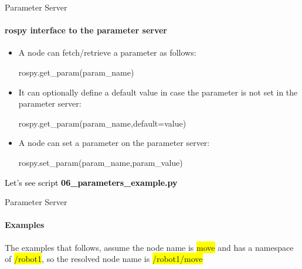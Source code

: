 \documentclass{beamer}
\begin{document}
\begin{frame}{Parameter Server}
    \framesubtitle{rospy interface to the parameter server}
    \begin{itemize}
        
        \item A node can fetch/retrieve a parameter as follows:
        
        
            \begin{focus}
                \centering
                \fontsize{9}{1} \ttfamily rospy.get\_param({\color{blue}param\_name})
            \end{focus}
       \item It can optionally define a default value in case the parameter is not set in the parameter server:
         \begin{focus}
             \centering
       \fontsize{9}{1} \ttfamily rospy.get\_param({\color{blue}param\_name},{\color{blue}default=value})
        \end{focus}
        
       \item A node can set a parameter on the parameter server:
       \begin{focus}
           \centering
           \fontsize{9}{1} \ttfamily rospy.set\_param({\color{blue}param\_name},{\color{blue}param\_value})
        \end{focus}
    \end{itemize}
\end{frame}



\begin{frame}[plain]{}  
    \centering
    {\huge \textcolor{black}{Let's see script \textbf{06\_parameters\_example.py}}}
\end{frame}



\begin{frame}{Parameter Server}
    \framesubtitle{Examples}

The examples that follows, assume the node name is {\ttfamily \colorbox{yellow}{move}}  and has a namespace of {\ttfamily \colorbox{yellow}{/robot1}}, so the resolved node name is   {\ttfamily \colorbox{yellow}{/robot1/move}} 

    
\end{frame}
\end{document}
